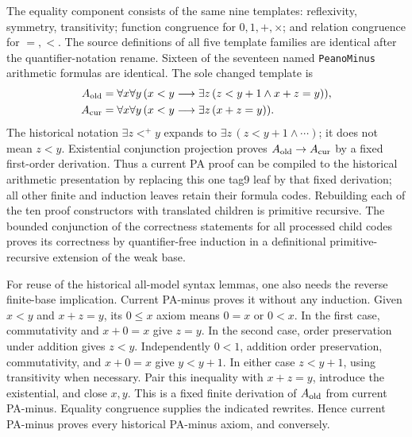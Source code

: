 The equality component consists of the same nine templates:
reflexivity, symmetry, transitivity; function congruence for
$0,1,+,\times$; and relation congruence for $=,<$.  The source
definitions of all five template families are identical after
the quantifier-notation rename.  Sixteen of the seventeen named
\texttt{PeanoMinus} arithmetic formulas are identical.  The sole
changed template is
\begin{align*}
 A_{\rm old}&=\forall x\forall y\,
   (x<y\longrightarrow\exists z\,(z<y+1\land x+z=y)),\\
 A_{\rm cur}&=\forall x\forall y\,
   (x<y\longrightarrow\exists z\,(x+z=y)).
\end{align*}
The historical notation $\exists z<^+y$ expands to
$\exists z\,(z<y+1\land\cdots)$; it does not mean $z<y$.
Existential conjunction projection proves $A_{\rm old}\to A_{\rm cur}$
by a fixed first-order derivation.  Thus a current PA proof can be
compiled to the historical arithmetic presentation by replacing
this one tag9 leaf by that fixed derivation; all other finite and
induction leaves retain their formula codes.  Rebuilding each of
the ten proof constructors with translated children is primitive
recursive.  The bounded conjunction of the correctness statements
for all processed child codes proves its correctness by
quantifier-free induction in a definitional primitive-recursive
extension of the weak base.

For reuse of the historical all-model syntax lemmas, one also needs
the reverse finite-base implication.  Current PA-minus proves it
without any induction.  Given $x<y$ and $x+z=y$, its $0\le x$
axiom means $0=x$ or $0<x$.  In the first case, commutativity and
$x+0=x$ give $z=y$.  In the second case, order preservation under
addition gives $z<y$.  Independently $0<1$, addition order
preservation, commutativity, and $x+0=x$ give $y<y+1$.
In either case $z<y+1$, using transitivity when necessary.
Pair this inequality with $x+z=y$, introduce the existential, and
close $x,y$.  This is a fixed finite derivation of $A_{\rm old}$
from current PA-minus.  Equality congruence supplies the indicated
rewrites.  Hence current PA-minus proves every historical
PA-minus axiom, and conversely.

